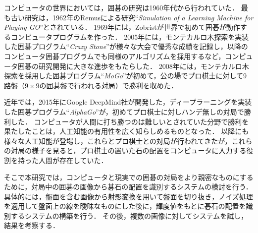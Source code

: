 \documentclass[openright]{nitocs}
\numberwithin{equation}{section}
\begin{document}
        コンピュータの世界においては，囲碁の研究は1960年代から行われていた．
        最も古い研究は，1962年のRemusによる研究``{\it Simulation of a Learning Machine for Playing GO}''\cite{Remus}とされている．
        1969年には，Zobristが世界で初めて囲碁が動作するコンピュータプログラムを作った\cite{Zobrist}．
        2005年には，モンテカルロ木探索を実装した囲碁プログラム``{\it Crazy Stone}''\cite{CrazyStone}が様々な大会で優秀な成績を記録し，以降のコンピュータ囲碁プログラムでも同様のアルゴリズムを採用するなど，コンピュータ囲碁の研究開発に大きな進歩をもたらした．
        2008年には，モンテカルロ木探索を採用した囲碁プログラム``{\it MoGo}''が初めて，公の場でプロ棋士に対して9路盤（$9\times9$の囲碁盤で行われる対局）で勝利を収めた\cite{mogo}．
        
        近年では，2015年にGoogle DeepMind社が開発した，ディープラーニングを実装した囲碁プログラム``{\it AlphaGo}''\cite{AlphaGo}が，初めてプロ棋士に対しハンデ無しの対局で勝利した．
        コンピュータが人間に打ち勝つのは難しいとされていた分野で勝利を果たしたことは，人工知能の有用性を広く知らしめるものとなった．
        以降にも様々な人工知能が登場し，これらとプロ棋士との対局が行われてきたが，これらの対局の様子を見ると，プロ棋士の置いた石の配置をコンピュータに入力する役割を持った人間が存在していた．

        そこで本研究では，コンピュータと現実での囲碁の対局をより親密なものにするために，対局中の囲碁の画像から碁石の配置を識別するシステムの検討を行う．
        具体的には，盤面を含む画像から射影変換を用いて盤面を切り抜き，ノイズ処理を適用して盤面上の線を曖昧なものにした後に，輝度値をもとに碁石の配置を識別するシステムの構築を行う．
        その後，複数の画像に対してシステムを試し，結果を考察する．
\end{document}

